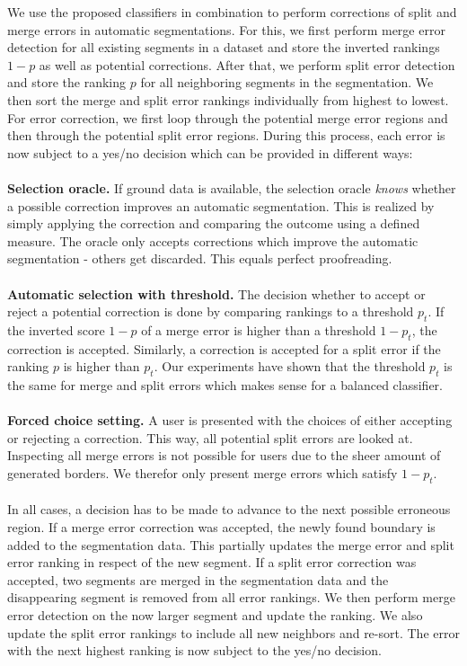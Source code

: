 We use the proposed classifiers in combination to perform corrections of split and merge errors in automatic segmentations. For this, we first perform merge error detection for all existing segments in a dataset and store the inverted rankings $1-p$ as well as potential corrections. After that, we perform split error detection and store the ranking $p$ for all neighboring segments in the segmentation. We then sort the merge and split error rankings individually from highest to lowest. 
For error correction, we first loop through the potential merge error regions and then through the potential split error regions. During this process, each error is now subject to a yes/no decision which can be provided in different ways: 
\\~\\
\textbf{Selection oracle.} If ground data is available, the selection oracle \textit{knows} whether a possible correction improves an automatic segmentation. This is realized by simply applying the correction and comparing the outcome using a defined measure. The oracle only accepts corrections which improve the automatic segmentation - others get 
discarded. This equals perfect proofreading.
\\~\\
\textbf{Automatic selection with threshold.} The decision whether to accept or reject a potential correction is done by comparing rankings to a threshold $p_t$. If the inverted score $1-p$ of a merge error is higher than a threshold $1-p_t$, the correction is accepted. Similarly, a correction is accepted for a split error if the ranking $p$ is higher than $p_t$. Our experiments have shown that the threshold $p_t$ is the same for merge and split errors which makes sense for a balanced classifier.
\\~\\
\textbf{Forced choice setting.} A user is presented with the choices of either accepting or rejecting a correction. This way, all potential split errors are looked at. Inspecting all merge errors is not possible for users due to the sheer amount of generated borders. We therefor only present merge errors which satisfy $1-p_t$. 
\\~\\
In all cases, a decision has to be made to advance to the next possible erroneous region. If a merge error correction was accepted, the newly found boundary is added to the segmentation data. This partially updates the merge error and split error ranking in respect of the new segment. If a split error correction was accepted, two segments are merged in the segmentation data and the disappearing segment is removed from all error rankings. We then perform merge error detection on the now larger segment and update the ranking. We also update the split error rankings to include all new neighbors and re-sort. The error with the next highest ranking is now subject to the yes/no decision.

